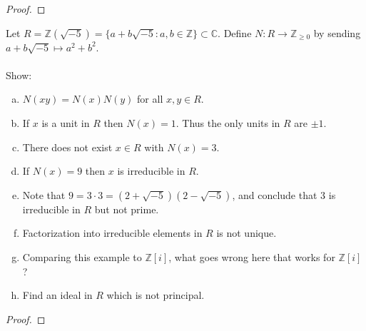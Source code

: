 \documentclass{article}
\newenvironment{problem}[2][Problem]{\begin{trivlist}
\item[\hskip \labelsep {\bfseries #1}\hskip \labelsep {\bfseries #2.}]}{\end{trivlist}}
\newcommand{\set}[1]{\{ #1 \}}
\newcommand{\fn}[3]{#1 \colon #2 \rightarrow #3}
\begin{document}
\begin{proof}
\end{proof}
\pagebreak
\begin{problem}[Extra]{Problem}
  Let $R = \mathbb Z(\sqrt{-5}) = \set{a + b\sqrt{-5}:a, b \in \mathbb Z} \subset \mathbb C$.
  Define
  $\fn NR{\mathbb Z_{\geq 0}}$ by sending
  $a + b\sqrt{-5} \mapsto a^2 + b^2$.
  \\~\\
  Show:
  \begin{enumerate}[(a)]
    \item $N(xy) = N(x)N(y)$ for all $x,y \in R$.
    \item If $x$ is a unit in $R$ then $N(x) = 1$. Thus the only units in $R$
      are $\pm 1$.
    \item There does not exist $x \in R$ with $N(x) = 3$.
    \item If $N(x) = 9$ then $x$ is irreducible in $R$.
    \item Note that $9 = 3 \cdot 3 = (2 + \sqrt{-5})(2 - \sqrt{-5})$, and
      conclude that $3$ is irreducible in $R$ but not prime.
    \item Factorization into irreducible elements in $R$ is not unique.
    \item Comparing this example to $\mathbb Z[i]$, what goes wrong here that
      works for $\mathbb Z[i]$?
    \item Find an ideal in $R$ which is not principal.
  \end{enumerate}
\end{problem}

\begin{proof}
\end{proof}
\end{document}
